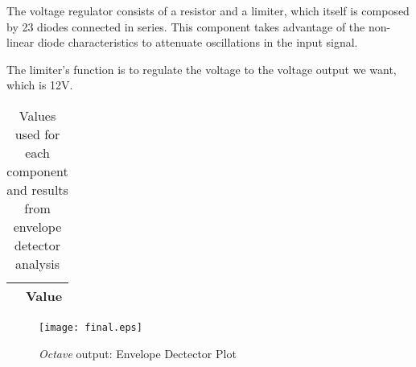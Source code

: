 The voltage regulator consists of a resistor and a limiter, which itself is composed by 23 diodes connected in series. This component takes advantage of the non-linear diode characteristics to attenuate oscillations in the input signal.

The limiter’s function is to regulate the voltage to the voltage output we want, which is 12V.

\begin{table}[h]
  \centering
  \begin{tabular}{|c|c|}
    \hline    
     & { Value} \\ \hline
    
 \end{tabular}
 \caption{Values used for each component and results from envelope detector analysis}
  \label{tab:op2}
\end{table}


\begin{figure}[h]
    \centering
    \texttt{[image: final.eps]}
    \caption{{\it Octave} output: Envelope Dectector Plot}
    \label{fig:OctaveOut}
\end{figure}

